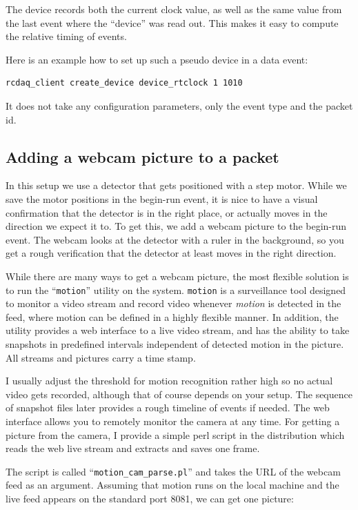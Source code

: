 \documentclass{article}[11pt]
\begin{document}
The device records both the current clock value, as well as the same
value from the last event where the ``device'' was read out. This
makes it easy to compute the relative timing of events.

Here is an example how to set up such a pseudo device in a data event:

\begin{verbatim}
rcdaq_client create_device device_rtclock 1 1010
\end{verbatim}

It does not take any configuration parameters, only the event type and
the packet id.

\subsection{Adding a webcam picture to a packet}

In this setup we use a detector that gets positioned with a step
motor. While we save the motor positions in the begin-run event, it is
nice to have a visual confirmation that the detector is in the right
place, or actually moves in the direction we expect it to. To get
this, we add a webcam picture to the begin-run event. The webcam looks
at the detector with a ruler in the background, so you get a rough
verification that the detector at least moves in the right direction.

While there are many ways to get a webcam picture, the most flexible
solution is to run the ``\verb|motion|'' utility on the
system. \verb|motion| is a surveillance tool designed to monitor a
video stream and record video whenever \emph{motion} is detected in
the feed, where motion can be defined in a highly flexible manner. In
addition, the utility provides a web interface to a live video stream,
and has the ability to take snapshots in predefined intervals
independent of detected motion in the picture. All streams and
pictures carry a time stamp.

I usually adjust the threshold for motion recognition rather high so
no actual video gets recorded, although that of course depends on your
setup. The sequence of snapshot files later provides a rough
timeline of events if needed. The web interface allows you to remotely
monitor the camera at any time. For getting a picture from the camera,
I provide a simple perl script in the distribution which reads the web
live stream and extracts and saves one frame.

The script is called ``\verb|motion_cam_parse.pl|'' and takes the URL
of the webcam feed as an argument. Assuming that motion runs on the
local machine and the live feed appears on the standard port 8081, we can
get one picture:
\end{document}
